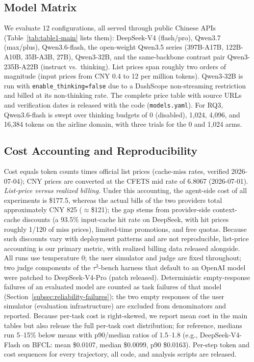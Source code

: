 \documentclass[preprint,authoryear,12pt]{elsarticle}
\begin{document}
\subsection{Model Matrix}
\label{subsec:model-matrix}
We evaluate 12 configurations, all served through public Chinese APIs (Table~\ref{tab:table1-main} lists them): DeepSeek-V4 (flash/pro), Qwen3.7 (max/plus), Qwen3.6-flash, the open-weight Qwen3.5 series (397B-A17B, 122B-A10B, 35B-A3B, 27B), Qwen3-32B, and the same-backbone contrast pair Qwen3-235B-A22B (instruct vs.\ thinking). List prices span roughly two orders of magnitude (input prices from CNY 0.4 to 12 per million tokens). Qwen3-32B is run with \texttt{enable\_thinking=false} due to a DashScope non-streaming restriction and billed at its non-thinking rate. The complete price table with source URLs and verification dates is released with the code (\texttt{models.yaml}). For RQ3, Qwen3.6-flash is swept over thinking budgets of 0 (disabled), 1{,}024, 4{,}096, and 16{,}384 tokens on the airline domain, with three trials for the 0 and 1{,}024 arms.

\subsection{Cost Accounting and Reproducibility}
\label{subsec:cost-accounting}
Cost equals token counts times official list prices (cache-miss rates, verified 2026-07-04); CNY prices are converted at the CFETS mid rate of 6.8067 (2026-07-01). \emph{List-price versus realized billing.} Under this accounting, the agent-side cost of all experiments is \$177.5, whereas the actual bills of the two providers total approximately CNY 825 ($\approx$\$121); the gap stems from provider-side context-cache discounts (a 93.5\% input-cache hit rate on DeepSeek, with hit prices roughly 1/120 of miss prices), limited-time promotions, and free quotas. Because such discounts vary with deployment patterns and are not reproducible, list-price accounting is our primary metric, with realized billing data released alongside. All runs use temperature 0; the user simulator and judge are fixed throughout; two judge components of the $\tau^3$-bench harness that default to an OpenAI model were patched to DeepSeek-V4-Pro (patch released). Deterministic empty-response failures of an evaluated model are counted as task failures of that model (Section~\ref{subsec:reliability-failures}); the two empty responses of the user simulator (evaluation infrastructure) are excluded from denominators and reported. Because per-task cost is right-skewed, we report mean cost in the main tables but also release the full per-task cost distribution; for reference, medians run 5--15\% below means with p90/median ratios of 1.5--1.8 (e.g., DeepSeek-V4-Flash on BFCL: mean \$0.0107, median \$0.0099, p90 \$0.0163). Per-step token and cost sequences for every trajectory, all code, and analysis scripts are released.
\end{document}
